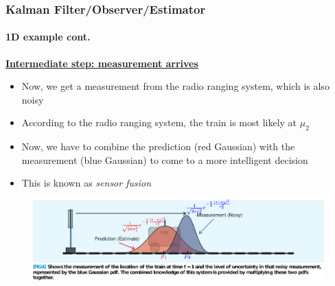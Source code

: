 \begin{frame}[plain]\pw\Large
\frametitle{Kalman Filter/Observer/Estimator}
\framesubtitle{1D example \tiny cont.}

\scriptsize

\underline{\textbf{Intermediate step: measurement arrives}}
\begin{itemize}\scriptsize
\item Now, we get a measurement from the radio ranging system, which is also noisy
\item According to the radio ranging system, the train is most likely at  $\mu_2$
\item Now, we have to combine the prediction (red Gaussian) with the measurement (blue Gaussian) to come to a more intelligent decision
\item This is known as \emph{sensor fusion}
\end{itemize}
\begin{figure}[h]
\centering
\includegraphics[width=1.35\textwidth]{figs/2012_MAG_Understanding_the_Basis_of_the_Kalman_Filter_fig4.pdf}
\end{figure}

\end{frame}


